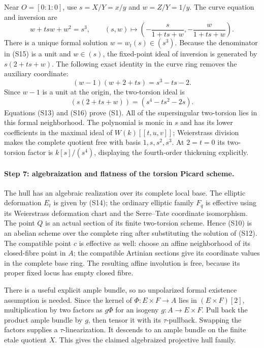 Near $O=[0:1:0]$, use $s=X/Y=x/y$ and $w=Z/Y=1/y$.
The curve equation and inversion are
\[
 w+t s w+w^2=s^3,\qquad
 (s,w)\longmapsto
 \left(-\frac{s}{1+ts+w},-\frac{w}{1+ts+w}\right).       \tag{S15}
\]
There is a unique formal solution $w=w_t(s)\in(s^3)$.
Because the denominator in (S15) is a unit and $w\in(s)$, the
fixed-point ideal of inversion is generated by
$s(2+ts+w)$. The following exact identity in the curve ring removes
the auxiliary coordinate:
\[
 (w-1)(w+2+ts)=s^3-ts-2.
\]
Since $w-1$ is a unit at the origin, the two-torsion ideal is
\[
 (s(2+ts+w))=(s^4-ts^2-2s).                             \tag{S16}
\]
Equations (S13) and (S16) prove (S1). All of the supersingular
two-torsion lies in this formal neighborhood. The polynomial is
monic in $s$ and has its lower coefficients in the maximal ideal of
$W(k)[[t,u,v]]$; Weierstrass division makes the complete quotient
free with basis $1,s,s^2,s^3$. At $2=t=0$ its two-torsion factor is
$k[s]/(s^4)$, displaying the fourth-order thickening explicitly.

\paragraph{Step 7: algebraization and flatness of the torsion Picard scheme.}
The hull has an algebraic realization over its complete local base.
The elliptic deformation $E_t$ is given by (S14); the ordinary
elliptic family $F_q$ is effective using its Weierstrass deformation
chart and the Serre--Tate coordinate isomorphism. The point $Q$ is
an actual section of its finite two-torsion scheme. Hence (S10) is
an abelian scheme over the complete ring after substituting the
solution of (S12). The compatible point $c$ is effective as well:
choose an affine neighborhood of its closed-fibre point in $A$;
the compatible Artinian sections give its coordinate values in the
complete base ring. The resulting affine involution is free, because
its proper fixed locus has empty closed fibre.

There is a useful explicit ample bundle, so no unpolarized formal
existence assumption is needed. Since the kernel of
$\Phi:E\times F\to A$ lies in $(E\times F)[2]$, multiplication
by two factors as $g\Phi$ for an isogeny $g:A\to E\times F$.
Pull back the product ample bundle by $g$, then tensor it with its
$\tau$-pullback. Swapping the factors supplies a $\tau$-linearization.
It descends to an ample bundle on the finite etale quotient $X$.
This gives the claimed algebraized projective hull family.

